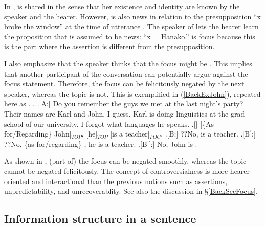In \Last[A],
 is shared in the sense that
her existence and identity are known by the speaker and the hearer.
However,
 is also news in relation to the presupposition
``x broke the window'' at the time of utterance \Last[Q].
The speaker of \Last[A] lets the hearer learn the proposition that is assumed to be news: ``x = Hanako.''
 is focus because
this is the part where the assertion is different from the presupposition.

I also emphasize that the speaker thinks that the focus might be .
This implies that another participant of the conversation can potentially argue against the focus statement.
Therefore, the focus can be felicitously negated by the next speaker,
whereas the topic is not.
This is exemplified in (\ref{BackExJohn}), repeated here as \Next.
%
\ex. \label{BackExJohn2}\a.[A:] Do you remember the guys we met at the last night's party?
     Their names are Karl and John, I guess.
     Karl is doing linguistics at the grad school of our university.
     I forgot what languages he speaks.
     \b.[] [\{As for/Regarding\} John]$_{TOP}$, [he]$_{TOP}$ [is a teacher]$_{FOC}$.
     \b.[B:] ??No,  is a teacher.
     \b.[B$^{\prime}$:] ??No, \{as for/regarding\} , he is a teacher.
     \b.[B$^{\prime\prime}$:] No, John is .

As shown in \Last,
(part of) the focus  can be negated smoothly,
whereas the topic  cannot be negated felicitously.
The concept of controversialness is more hearer-oriented and interactional than the previous notions such as assertions, unpredictability, and unrecoverablity.
See also the discussion in \S \ref{BackSecFocus}.

\subsection{Information structure in a sentence}\label{FrameworkIS}


